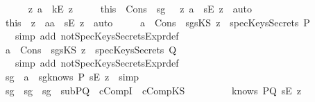 \begin{isabellebody}
\ \ \isamarkupfalse \ \isanewline
\ \ \ \ \isamarkupfalse \ {\isachardoublequoteopen}{\isasymnot}\ {\isacharparenleft}{\isasymexists}z{}{\isachardot}\ a\ {\isacharequal}\ kE\ z{}{\isacharparenright}{\isachardoublequoteclose}\isanewline
\ \ \ \ \isamarkupfalse \ this\ \ Cons\ \ sg{}\ \isamarkupfalse \ {\isachardoublequoteopen}{\isasymexists}\ z{}{\isachardot}\ a\ {\isacharequal}\ {\isacharparenleft}sE\ z{}{\isacharparenright}{\isachardoublequoteclose}\ \isamarkupfalse \ auto\isanewline
\ \ \ \ \isamarkupfalse \ this\ \isamarkupfalse \ z\ \ a{}{\isacharcolon}{\isachardoublequoteopen}a\ {\isacharequal}\ {\isacharparenleft}sE\ z{\isacharparenright}{\isachardoublequoteclose}\ \isamarkupfalse \ auto\isanewline
\ \ \ \ \isamarkupfalse \ a{}\ \ Cons\ \isamarkupfalse \ sg{}{\isacharcolon}{\isachardoublequoteopen}{\isacharparenleft}sKS\ z{\isacharparenright}\ {\isasymnotin}\ specKeysSecrets\ P{\isachardoublequoteclose}\ \isanewline
\ \ \ \ \ \ \isamarkupfalse \ {\isacharparenleft}simp\ add{\isacharcolon}\ notSpecKeysSecretsExpr{\isacharunderscore}def{\isacharparenright}\isanewline
\ \ \ \ \isamarkupfalse \ a{}\ \ Cons\ \isamarkupfalse \ sg{}{\isacharcolon}{\isachardoublequoteopen}{\isacharparenleft}sKS\ z{\isacharparenright}\ {\isasymnotin}\ specKeysSecrets\ Q{\isachardoublequoteclose}\isanewline
\ \ \ \ \ \ \isamarkupfalse \ {\isacharparenleft}simp\ add{\isacharcolon}\ notSpecKeysSecretsExpr{\isacharunderscore}def{\isacharparenright}\isanewline
\ \ \ \ \isamarkupfalse \ sg{}\ \ a{}\ \isamarkupfalse \ sg{}{}{\isacharcolon}{\isachardoublequoteopen}knows\ P\ {\isacharbrackleft}sE\ z{\isacharbrackright}{\isachardoublequoteclose}\ \isamarkupfalse \ simp\ \isanewline
\ \ \ \ \isamarkupfalse \ sg{}\ \ sg{}\ \ sg{}{}\ \ subPQ\ \ cCompI\ \ cCompKS\ \ \isanewline
\ \ \ \ \ \ \isamarkupfalse \ {\isachardoublequoteopen}knows\ PQ\ {\isacharbrackleft}sE\ z{\isacharbrackright}{\isachardoublequoteclose}\ \isanewline

\end{isabellebody}
